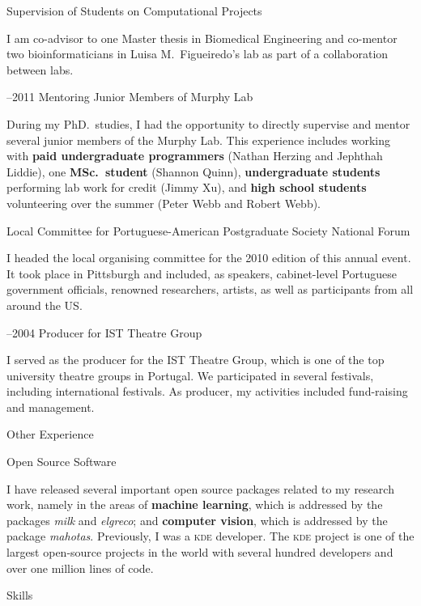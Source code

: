 \documentclass{article}
\renewcommand\section[1]{%
    \par\vspace{2em}\penalty-100%
    {\subhead #1}%
    \par\penalty100\vspace{1em}\penalty100%
}
\newcommand\cvitem[2][\relax]{%
    \par\vspace{.8em}
    \if\relax#1\else{\Date \textcolor{medg}{#1}}\hspace{1em}\fi%
    {\CvItem #2}%
    \par\vspace{.4em}
}
\newcommand\ignore[1]{\relax}
\begin{document}
\cvitem[2012]{Supervision of Students on Computational Projects}
I am co-advisor to one Master thesis in Biomedical Engineering and co-mentor
two bioinformaticians in Luisa M.\ Figueiredo's lab as part of a collaboration
between labs.

\cvitem[2008--2011]{Mentoring Junior Members of Murphy Lab}
During my PhD.\ studies, I had the opportunity to directly supervise and mentor
several junior members of the Murphy Lab. This experience includes working with
\textbf{paid undergraduate programmers} (Nathan Herzing and Jephthah
Liddie\ignore{---both currently still students at Carnegie Mellon University}),
one \textbf{MSc.\ student} (Shannon Quinn\ignore{, currently a doctoral student
in the Joint Carnegie Mellon University--University of Pittsburgh PhD.\ Program
in Computational Biology}), \textbf{undergraduate students} performing lab work
for credit (Jimmy Xu), and \textbf{high school students} volunteering over the
summer (Peter Webb and Robert Webb).


\cvitem[2010]{Local Committee for Portuguese-American Postgraduate Society National Forum}
I headed the local organising committee for the 2010 edition of this annual
event. It took place in Pittsburgh and included, as speakers, cabinet-level
Portuguese government officials, renowned researchers, artists, as well as
participants from all around the US.

\cvitem[2002--2004]{Producer for IST Theatre Group}
I served as the producer for the IST Theatre Group, which is one of the top
university theatre groups in Portugal. We participated in several festivals,
including international festivals. As producer, my activities included
fund-raising and management.

\section{Other Experience}

\cvitem{Open Source Software}
I have released several important open source packages related to my research
work, namely in the areas of \textbf{machine learning}, which is addressed by
the packages \textit{milk} and \textit{elgreco}; and \textbf{computer vision},
which is addressed by the package \textit{mahotas}. Previously, I was a
\textsc{kde} developer. The \textsc{kde} project is one of the largest
open-source projects in the world with several hundred developers and over one
million lines of code.

\section{Skills}
\end{document}
